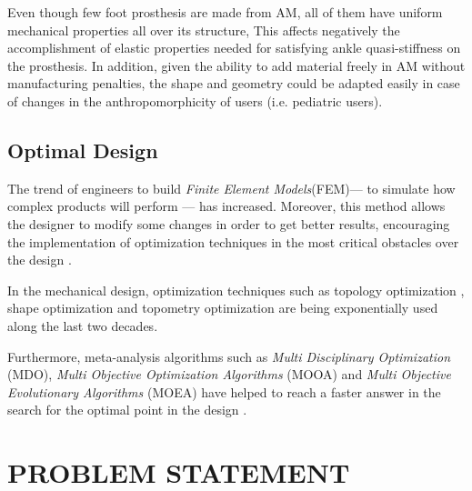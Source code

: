 \documentclass[12pt,english]{article}
\begin{document}
Even though few foot prosthesis are made from AM, all of them have uniform mechanical properties all over its structure, This affects negatively the accomplishment of elastic properties needed for satisfying ankle quasi-stiffness on the prosthesis. In addition, given the ability to add material freely in AM without manufacturing penalties, the shape and geometry could be adapted easily in case of changes in the anthropomorphicity of users (i.e. pediatric users).

\subsection{Optimal Design}

The trend of engineers to build \emph{ Finite Element Models}(FEM)--- to simulate how complex products will perform --- has increased. Moreover, this method allows the designer to modify some changes in order to get better results, encouraging the implementation of optimization techniques in the most critical obstacles over the design \cite{Forrester2008}. 

In the mechanical design, optimization techniques such as topology optimization \cite{Sigmund2001, Andreassen2011}, shape optimization \cite{Munk2015} and topometry optimization are being exponentially used along the last two decades.

Furthermore, meta-analysis algorithms such as \emph{Multi Disciplinary Optimization} (MDO), \emph{Multi Objective Optimization Algorithms} (MOOA) and \emph{Multi Objective Evolutionary Algorithms} \cite{Wnag2006} (MOEA) have helped to reach a faster answer in the search for the optimal point in the design \cite{Suresh2010, Huang2010}. 





\section{PROBLEM STATEMENT}
\end{document}
